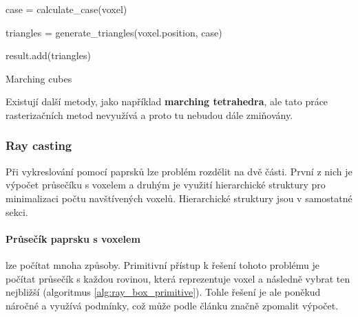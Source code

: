 \begin{center}
\begin{czechalgorithm}[H] \label{alg:marching_cubes}
     {
        case = calculate\_case(voxel)
        
        triangles = generate\_triangles(voxel.position, case)
        
        result.add(triangles)
        
    }
 \caption{Marching cubes}
\end{czechalgorithm}
\end{center}

Existují další metody, jako například \textbf{marching tetrahedra}, ale tato práce rasterizačních metod nevyužívá a proto tu nebudou dále zmiňovány.

\subsubsection{Ray casting} \label{sec:voxel_intersection}
Při vykreslování pomocí paprsků lze problém rozdělit na dvě části. První z nich je výpočet průsečíku s voxelem a druhým je využití hierarchické struktury pro minimalizaci počtu navštívených voxelů. Hierarchické struktury jsou v samostatné sekci.

\paragraph{Průsečík paprsku s voxelem} lze počítat mnoha způsoby. Primitivní přístup k řešení tohoto problému je počítat průsečík s každou rovinou, která reprezentuje voxel a následně vybrat ten nejbližší (algoritmus \ref{alg:ray_box_primitive}). Tohle řešení je ale poněkud náročné a využívá podmínky, což může podle článku \cite{gpu_branch} značně zpomalit výpočet.


